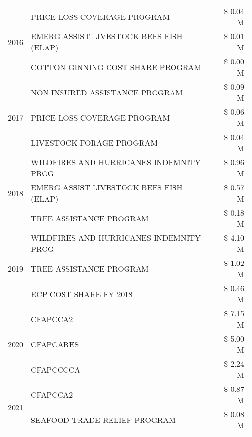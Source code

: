 \begin{tabular}{llr}
\cline{1-3}
\multirow[t]{3}{*}{2016} & PRICE LOSS COVERAGE PROGRAM                   & \$ 0.04 M \\
 & EMERG ASSIST LIVESTOCK BEES FISH (ELAP)       & \$ 0.01 M \\
 & COTTON GINNING COST SHARE PROGRAM             & \$ 0.00 M \\
\cline{1-3}
\multirow[t]{3}{*}{2017} & NON-INSURED ASSISTANCE PROGRAM & \$ 0.09 M \\
 & PRICE LOSS COVERAGE PROGRAM & \$ 0.06 M \\
 & LIVESTOCK FORAGE PROGRAM & \$ 0.04 M \\
\cline{1-3}
\multirow[t]{3}{*}{2018} & WILDFIRES AND HURRICANES INDEMNITY PROG & \$ 0.96 M \\
 & EMERG ASSIST LIVESTOCK BEES FISH (ELAP) & \$ 0.57 M \\
 & TREE ASSISTANCE PROGRAM & \$ 0.18 M \\
\cline{1-3}
\multirow[t]{3}{*}{2019} & WILDFIRES AND HURRICANES INDEMNITY PROG & \$ 4.10 M \\
 & TREE ASSISTANCE PROGRAM & \$ 1.02 M \\
 & ECP COST SHARE FY 2018 & \$ 0.46 M \\
\cline{1-3}
\multirow[t]{3}{*}{2020} & CFAPCCA2 & \$ 7.15 M \\
 & CFAPCARES & \$ 5.00 M \\
 & CFAPCCCCA & \$ 2.24 M \\
\cline{1-3}
\multirow[t]{2}{*}{2021} & CFAPCCA2 & \$ 0.87 M \\
 & SEAFOOD TRADE RELIEF PROGRAM & \$ 0.08 M \\
\cline{1-3}
\bottomrule
\end{tabular}
